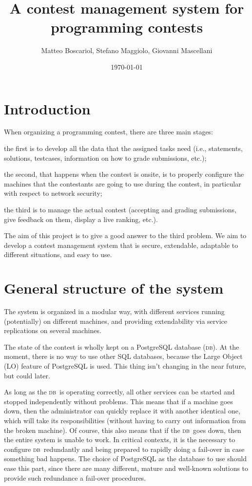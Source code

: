 \documentclass[a4paper,8pt]{amsart}
\title{A contest management system for programming contests}
\author{Matteo Boscariol, Stefano Maggiolo, Giovanni Mascellani}
\date{\today}
\newcommand{\DB}{\textsc{db}}
\newenvironment{squishlist}{%
  \begin{list}{\textbullet}%
    { \setlength{\itemsep}{0pt}%
      \setlength{\parsep}{3pt}%
      \setlength{\topsep}{3pt}%
      \setlength{\partopsep}{0pt}%
      \setlength{\leftmargin}{1.5em}%
      \setlength{\labelwidth}{1em}%
      \setlength{\labelsep}{0.5em} }%
}{\end{list}}
\begin{document}
\maketitle
\tableofcontents

\begin{multicols}{2}

  \section{Introduction}

  When organizing a programming contest, there are three main stages:
  \begin{squishlist}
  \item the first is to develop all the data that the assigned tasks
    need (i.e., statements, solutions, testcases, information on how
    to grade submissions, etc.);
  \item the second, that happens when the contest is onsite, is to
    properly configure the machines that the contestants are going to
    use during the contest, in particular with respect to network
    security;
  \item the third is to manage the actual contest (accepting and
    grading submissions, give feedback on them, display a live
    ranking, etc.).
  \end{squishlist}

  The aim of this project is to give a good answer to the third
  problem. We aim to develop a contest management system that is
  secure, extendable, adaptable to different situations, and easy to
  use.

  \section{General structure of the system}

  The system is organized in a modular way, with different services
  running (potentially) on different machines, and providing
  extendability via service replications on several machines.

  The state of the contest is wholly kept on a PostgreSQL database
  (\DB). At the moment, there is no way to use other SQL databases,
  because the Large Object (LO) feature of PostgreSQL is used. This
  thing isn't changing in the near future, but could later.

  As long as the \DB\ is operating correctly, all other services can
  be started and stopped independently without problems. This means
  that if a machine goes down, then the administrator can quickly
  replace it with another identical one, which will take its
  responsibilities (without having to carry out information from the
  broken machine). Of course, this also means that if the \DB\ goes
  down, then the entire system is unable to work. In critical
  contexts, it is the necessary to configure \DB\ redundantly and
  being prepared to rapidly doing a fail-over in case something bad
  happens. The choice of PostgreSQL as the database to use should ease
  this part, since there are many different, mature and well-known
  solutions to provide such redundance a fail-over procedures.


\end{multicols}
\end{document}
